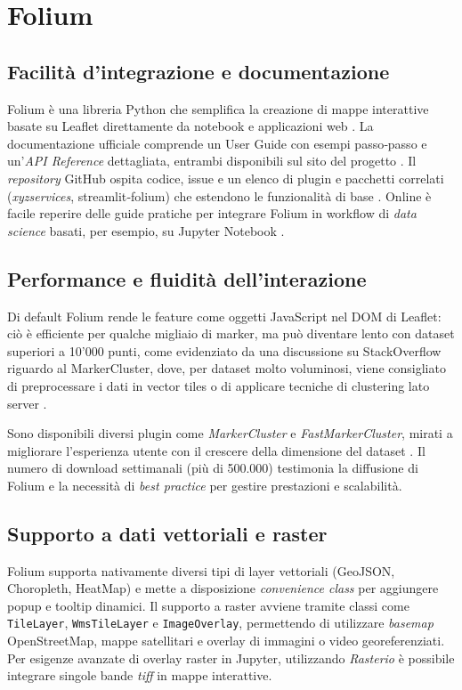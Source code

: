 \section{Folium}
\label{ch:folium}

\subsection{Facilità d'integrazione e documentazione}  
Folium è una libreria Python che semplifica la creazione di mappe interattive basate su Leaflet direttamente da notebook e applicazioni web \cite{folium-doc}.
La documentazione ufficiale comprende un User Guide con esempi passo‑passo e un'\textit{API Reference} dettagliata, entrambi disponibili sul sito del progetto \cite{folium-userguide}.  
Il \textit{repository} GitHub ospita codice, issue e un elenco di plugin e pacchetti correlati (\textit{xyzservices}, streamlit‑folium) che estendono le funzionalità di base \cite{folium-github,folium-pypistats}.  
Online è facile reperire delle guide pratiche per integrare Folium in workflow di \textit{data science} basati, per esempio, su Jupyter Notebook \cite{folium-tutorial,folium-realpython}.

\subsection{Performance e fluidità dell'interazione}  
Di default Folium rende le feature come oggetti JavaScript nel DOM di Leaflet: ciò è efficiente per qualche migliaio di marker, ma può diventare lento con dataset superiori a 10'000 punti, come evidenziato da una discussione su StackOverflow riguardo al MarkerCluster, dove, per dataset molto voluminosi, viene consigliato di preprocessare i dati in vector tiles o di applicare tecniche di clustering lato server \cite{folium-cluster-issue}.  

Sono disponibili diversi plugin come \textit{MarkerCluster} e \textit{FastMarkerCluster}, mirati a migliorare l'esperienza utente con il crescere della dimensione del dataset \cite{folium-cluster-issue,folium-pypistats}.  
Il numero di download settimanali (più di 500.000) testimonia la diffusione di Folium e la necessità di \textit{best practice} per gestire prestazioni e scalabilità.

\subsection{Supporto a dati vettoriali e raster}  
Folium supporta nativamente diversi tipi di layer vettoriali (GeoJSON, Choropleth, HeatMap) e mette a disposizione \textit{convenience class} per aggiungere popup e tooltip dinamici.  
Il supporto a raster avviene tramite classi come \texttt{TileLayer}, \texttt{WmsTileLayer} e \texttt{ImageOverlay}, permettendo di utilizzare \textit{basemap} OpenStreetMap, mappe satellitari e overlay di immagini o video georeferenziati.  
Per esigenze avanzate di overlay raster in Jupyter, utilizzando \textit{Rasterio} è possibile integrare singole bande \textit{tiff} in mappe interattive. \cite{folium-raster,folium-tutorial, folium-doc}

